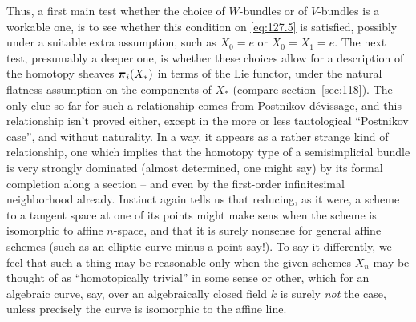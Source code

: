 Thus, a first main test whether the choice of $W$-bundles or of
$V$-bundles is a workable one, is to see whether this condition on
\eqref{eq:127.5} is satisfied, possibly under a suitable extra
assumption, such as $X_0=e$ or $X_0=X_1=e$. The next test, presumably
a deeper one, is whether these choices allow for a description of the
homotopy sheaves ${\boldsymbol\pi}_i(X_*)$ in terms of the Lie functor, under the
natural flatness assumption on the components of $X_*$ (compare
section~\ref{sec:118}). The only clue so far for such a relationship
comes from Postnikov dévissage, and this relationship isn't proved
either, except in the more or less tautological ``Postnikov case'',
and without naturality. In a way, it appears as a rather strange kind
of relationship, one which implies that the homotopy type of a
semisimplicial bundle is very strongly dominated (almost determined,
one might say) by its formal completion along a section -- and even by
the first-order infinitesimal neighborhood already. Instinct again
tells us that reducing, as it were, a scheme to a tangent space at one
of its points might make sens when the scheme is isomorphic to affine
$n$-space, and that it is surely nonsense for general affine schemes
(such as an elliptic curve minus a point say!). To say it differently,
we feel that such a thing may be reasonable only when the given
schemes $X_n$ may be thought of as ``homotopically trivial'' in some
sense or other, which for an algebraic curve, say, over an
algebraically closed field $k$ is surely \emph{not} the case, unless
precisely the curve is isomorphic to the affine line.

\bigbreak

\presectionfill{}\par

